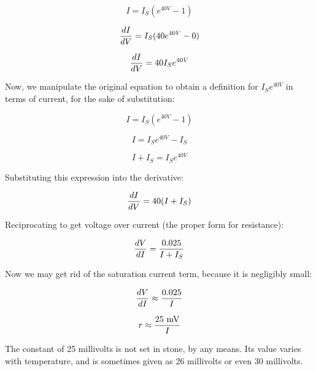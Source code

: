 $$I = I_S (e^{40 V} - 1)$$

$${dI \over dV} = I_S (40e^{40 V} - 0)$$

$${dI \over dV} = 40 I_S e^{40 V}$$

Now, we manipulate the original equation to obtain a definition for $I_S e^{40 V}$ in terms of current, for the sake of substitution:

$$I = I_S (e^{40 V} - 1)$$

$$I = I_S e^{40 V} - I_S$$

$$I + I_S = I_S e^{40 V}$$

Substituting this expression into the derivative:

$${dI \over dV} = 40 (I + I_S)$$

Reciprocating to get voltage over current (the proper form for resistance):

$${dV \over dI} = {0.025 \over {I + I_S}}$$

Now we may get rid of the saturation current term, because it is negligibly small:

$${dV \over dI} \approx {0.025 \over I}$$

$$r \approx {\hbox{25 mV} \over I}$$

The constant of 25 millivolts is not set in stone, by any means.  Its value varies with temperature, and is sometimes given as 26 millivolts or even 30 millivolts.




